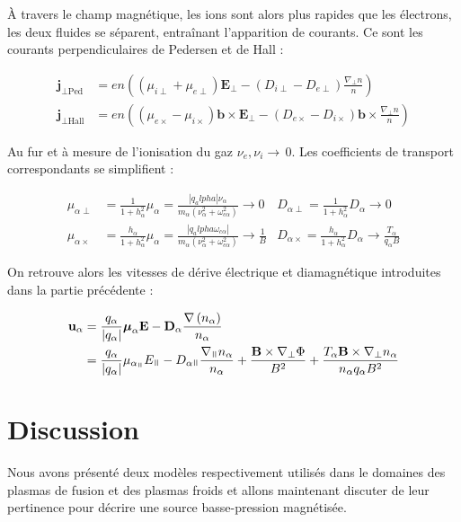 \begin{refsection}
À travers le champ magnétique, les ions sont alors plus rapides que les
électrons, les deux fluides se séparent, entraînant l'apparition de
courants. Ce sont les courants perpendiculaires de Pedersen et de Hall :

\begin{align}
\mathbf j_{\perp\text{Ped}}&=en\left((\mu_{i\perp}+\mu_{e\perp})\mathbf E_\perp
- (D_{i\perp}-D_{e\perp})\frac{\nabla_\perp n}{n}\right)\\
\mathbf j_{\perp\text{Hall}}&=en\left((\mu_{e\times}-\mu_{i\times})\mathbf
b\times\mathbf E_\perp - (D_{e\times}-D_{i\times})\mathbf
b\times\frac{\nabla_\perp n}{n}\right)
\end{align}

Au fur et à mesure de l'ionisation du gaz $\nu_e, \nu_i\rightarrow\,$0. Les
coefficients de transport correspondants se simplifient :

\begin{align}
\mu_{\alpha\perp}&=\frac{1}{1+h_\alpha^2}\mu_\alpha=\frac{|q_alpha|\nu_\alpha}{m_\alpha(\nu_\alpha^2+\omega_{c\alpha}^2)}\rightarrow
0 &D_{\alpha\perp}=\frac{1}{1+h_\alpha^2}D_\alpha\rightarrow 0
\\
\mu_{\alpha\times}&=\frac{h_\alpha}{1+h_\alpha^2}\mu_\alpha=\frac{|q_alpha\omega_{c\alpha}|}{m_\alpha(\nu_\alpha^2+\omega_{c\alpha}^2)}\rightarrow\frac{1}{B}
&D_{\alpha\times}=\frac{h_\alpha}{1+h_\alpha^2}D_\alpha\rightarrow\frac{T_\alpha}{q_\alpha
B}
\end{align}

On retrouve alors les vitesses de dérive électrique et diamagnétique
introduites dans la partie précédente :

\begin{equation}
\begin{split}
\mathbf u_\alpha&=\frac{q_\alpha}{|q_\alpha|}\boldsymbol{\mu}_\alpha
\mathbf E-\mathbf D_\alpha\frac{\nabla\left( n_\alpha\right)}{n_\alpha}
\\
&= \frac{q_\alpha}{|q_\alpha|}\mu_{\alpha_\para} E_\para -
D_{\alpha\para}\frac{\nabla_\para n_\alpha}{n_\alpha} + \frac{\mathbf
B\times\nabla_\perp \Phi}{B^2}+\frac{T_\alpha\mathbf B\times\nabla_\perp
n_\alpha}{n_\alpha q_\alpha B^2}
\end{split}
\end{equation}

\section{Discussion}
Nous avons présenté deux modèles respectivement utilisés dans le domaines des
plasmas de fusion et des plasmas froids et allons maintenant discuter de leur
pertinence pour décrire une source basse-pression magnétisée.


\end{refsection}
